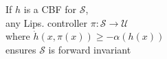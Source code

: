 \documentclass[preview]{standalone}
\begin{document}
\begin{center}
If $h$ is a CBF for $\mathcal{S}$,\\any Lips. controller $\pi : \mathcal{S} \to \mathcal{U}$\\ where $\dot h(x, \pi(x)) \geq -\alpha(h(x))$\\ensures $\mathcal{S}$ is forward invariant
\end{center}
\end{document}
